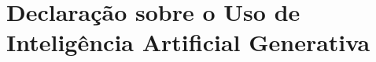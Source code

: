 \documentclass[	12pt, Times, openright, twoside, a4paper, english, brazil]{abntex2}
\begin{document}








\chapter{Declaração sobre o Uso de Inteligência Artificial Generativa}
\end{document}
